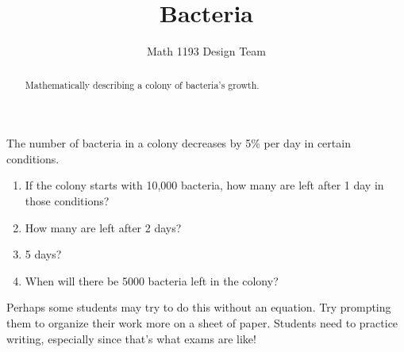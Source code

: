 \documentclass[noauthor]{ximera}
\title{Bacteria}
\author{Math 1193 Design Team}
\begin{document}
\begin{abstract}
    Mathematically describing a colony of bacteria's growth.
\end{abstract}
\maketitle

The number of bacteria in a colony decreases by 5\% per day in certain conditions.

\begin{enumerate}
    \item If the colony starts with 10,000 bacteria, how many are left
    after 1 day in those conditions?
    \item How many are left after 2 days?
    \item 5 days?
    \item When will there be 5000 bacteria left in the colony?
\end{enumerate}

\begin{instructorNotes}
Perhaps some students may try to do this without an equation. Try 
prompting them to organize their work more on a sheet of paper.
Students need to practice writing, especially since that's what exams 
are like!
\end{instructorNotes}
\end{document}
